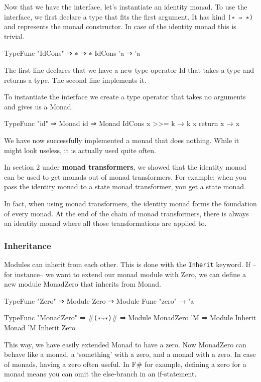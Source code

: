 Now that we have the interface, let's instantiate an identity monad.
To use the interface, we first declare a type that fits the first argument.
It has kind \verb|(∗ ⇒ ∗)| and represents the monad constructor.
In case of the identity monad this is trivial.

\begin{code}
  TypeFunc "IdCons" ⇒ ∗ ⇒ ∗
  IdCons 'a ⇒ 'a
\end{code}

The first line declares that we have a new type operator Id that takes a type and returns a type.
The second line implements it. 

To instantiate the interface we create a type operator that takes no arguments and gives us a Monad.

\begin{code}
  TypeFunc "id" ⇒ Monad 
  id ⇒ Monad IdCons {
    x >>= k → k x
    return x → x
  }
\end{code}

We have now successfully implemented a monad that does nothing.
While it might look useless, it is actually used quite often.

In section 2 under \textbf{monad transformers},
we showed that the identity monad can be used to get monads out of monad transformers.
For example: when you pass the identity monad to a state monad transformer, you get a state monad.

In fact, when using monad transformers, the identity monad forms the foundation of every monad.
At the end of the chain of monad transformers, there is always an identity monad where all those transformations are applied to.

\subsubsection*{Inheritance}
Modules can inherit from each other.
This is done with the \verb|Inherit| keyword. 
If --for instance-- we want to extend our monad module with Zero,
we can define a new module MonadZero that inherits from Monad.

\begin{code}
  TypeFunc "Zero" ⇒ Module
  Zero ⇒ Module {
    Func "zero" → 'a
  }

  TypeFunc "MonadZero" ⇒ #\verb|(∗⇒∗)|# ⇒ Module
  MonadZero 'M ⇒ Module {
    Inherit Monad 'M
    Inherit Zero
  }
\end{code}

This way, we have easily extended Monad to have a zero.
Now MonadZero can behave like a monad, a `something' with a zero, and a monad with a zero.
In case of monads, having a zero often useful.
In F\# for example, defining a zero for a monad means you can omit the else-branch in an if-statement.

